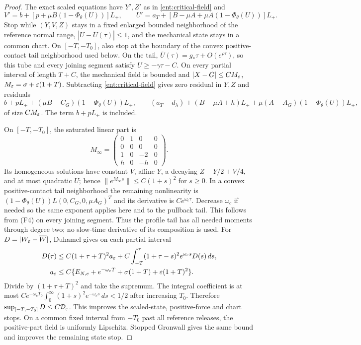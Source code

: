 \begin{proof}
The exact scaled equations have $Y',Z'$ as in
\eqref{ent:critical-field} and
\[
 V'=b+[p+\mu B(1-\Phi_\theta(U))]L_+,\qquad
 U'=a_T+[B-\mu A+\mu A(1-\Phi_\theta(U))]L_+.
\]
Stop while $(Y,V,Z)$ stays in a fixed enlarged bounded neighborhood
of the reference normal range, $|U-\overline U(\tau)|\le1$,
and the mechanical state stays in a common chart. On $[-T,-T_0]$,
also stop at the boundary of the convex positive-contact tail
neighborhood used below. On the tail,
$\overline U(\tau)=g_*\tau+O(e^{\rho\tau})$, so this tube and
every joining segment satisfy $U\ge-\gamma\tau-C$.
On every partial interval of length $T+C$, the mechanical field is bounded and
$|X-G|\le CM_\varepsilon$, $M_\varepsilon=\sigma+\varepsilon(1+T)$.
Subtracting \eqref{ent:critical-field} gives zero residual in $Y,Z$
and residuals
\[
 b+pL_++(\mu B-C_G)(1-\Phi_\theta(U))L_+,\qquad
 (a_T-d_\lambda)+(B-\mu A+h)L_++\mu(A-A_G)(1-\Phi_\theta(U))L_+,
\]
of size $CM_\varepsilon$. The term $b+pL_+$ is included.

On $[-T,-T_0]$, the saturated linear part is
\[
 M_\infty=\begin{pmatrix}0&1&0&0\\0&0&0&0\\1&0&-2&0\\h&0&-h&0\end{pmatrix}.
\]
Its homogeneous solutions have constant $V$, affine $Y$, a decaying
$Z-Y/2+V/4$, and at most quadratic $U$; hence
$\|e^{M_\infty s}\|\le C(1+s)^2$ for $s\ge0$.
In a convex positive-contact tail neighborhood the remaining
nonlinearity is
$(1-\Phi_\theta(U))L(0,C_G,0,\mu A_G)^T$ and its derivative is
$Ce^{\omega_c\tau}$. Decrease $\omega_c$ if needed so the same
exponent applies here and to the pullback tail. This follows from
(F4) on every joining segment.
Thus the profile tail has all needed moments through degree two;
no slow-time derivative of its composition is used.
For $D=|W_\varepsilon-\overline W|$, Duhamel gives on each partial interval
\[
 \begin{aligned}
 D(\tau)&\le C(1+\tau+T)^2a_\varepsilon
 +C\int_{-T}^{\tau}(1+\tau-s)^2e^{\omega_cs}D(s)\,ds,\\
 a_\varepsilon&\le C\{E_{N,e}+e^{-\omega_c T}
                      +\sigma(1+T)+\varepsilon(1+T)^2\}.
 \end{aligned}
\]
Divide by $(1+\tau+T)^2$ and take the supremum. The integral
coefficient is at most
$Ce^{-\omega_c T_0}\int_0^\infty(1+s)^2e^{-\omega_cs}\,ds<1/2$
after increasing $T_0$. Therefore
$\sup_{[-T,-T_0]}D\le C\mathcal D_\varepsilon$.
This improves the scaled-state, positive-force and chart stops.
On a common fixed interval from $-T_0$ past all reference releases,
the positive-part field is uniformly Lipschitz. Stopped Gronwall
gives the same bound and improves the remaining state stop.


\end{proof}
